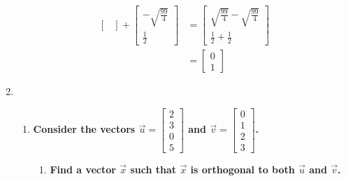 \documentclass[11pt]{article}
\begin{document}
\begin{enumerate}[label=\textbf{\arabic*.}]
\begin{align*}
\begin{bmatrix}
            \end{bmatrix}
            +
            \begin{bmatrix}
                -\sqrt{\frac{99}{4}} \\
                \frac{1}{2}
            \end{bmatrix}
            &=
            \begin{bmatrix}
                \sqrt{\frac{99}{4}}-\sqrt{\frac{99}{4}} \\
                \frac{1}{2}+\frac{1}{2}
            \end{bmatrix} \\
            &=
            \begin{bmatrix}
                0 \\
                1
            \end{bmatrix}
        \end{align*}
    \item
        \begin{enumerate}[label=\textbf{(\alph*)}]
            \item
                \textbf{\boldmath Consider the vectors $\vec{u}=\begin{bmatrix}2\\3\\0\\5\end{bmatrix}$ and $\vec{v}=\begin{bmatrix}0\\1\\2\\3\end{bmatrix}$.}
                \begin{enumerate}[label=\textbf{\roman*.}]
                    \item
                        \textbf{\boldmath Find a vector $\vec{x}$ such that $\vec{x}$ is orthogonal to both $\vec{u}$ and $\vec{v}$.}
                        \par\noindent
                        
                \end{enumerate}
        \end{enumerate}
\end{enumerate}
\end{document}

